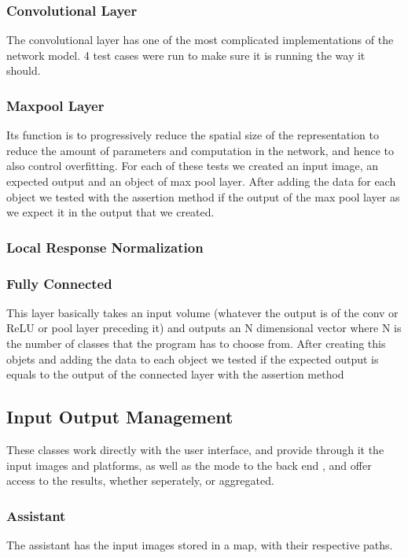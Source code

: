 \documentclass[parskip=full]{scrartcl}
\begin{document}
\subsubsection{Convolutional Layer}
The convolutional layer has one of the most complicated implementations of the network model. 4 test cases were run to make sure it is running the way it should.
\subsubsection{Maxpool Layer}
Its function is to progressively reduce the spatial size of the representation to reduce the amount of parameters and computation in the network, and hence to also control overfitting. 
For each of these tests we created an input image, an expected output and an object of max pool layer. After adding the data for each object we tested with the assertion method if the output of the max pool layer as we expect it in the output that we created. 
\subsubsection{Local Response Normalization}
\subsubsection{Fully Connected}
This layer basically takes an input volume (whatever the output is of the conv or ReLU or pool layer preceding it) and outputs an N dimensional vector where N is the number of classes that the program has to choose from.
After creating this objets and adding the data to each object we tested if the expected output is equals to the output of the connected layer with the assertion method
\pagebreak
\subsection{Input Output Management}
These classes work directly with the user interface, and provide through it the input images and platforms, as well as the mode to the back end , and offer access to the results, whether seperately, or aggregated.
\subsubsection{Assistant}
The assistant has the input images stored in a map, with their respective paths.
\end{document}
